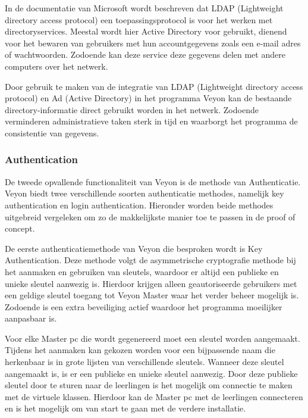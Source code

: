  In de documentatie van Microsoft \textcite{janicericketts-2023} wordt beschreven dat LDAP (Lightweight directory access protocol) een toepassingsprotocol is voor het werken met directoryservices. Meestal wordt hier Active Directory voor gebruikt, dienend voor het bewaren van gebruikers met hun accountgegevens zoals een e-mail adres of wachtwoorden. Zodoende kan deze service deze gegevens delen met andere computers over het netwerk.
 
 Door gebruik te maken van de integratie van LDAP (Lightweight directory access protocol) en Ad (Active Directory) in het programma Veyon kan de bestaande directory-informatie direct gebruikt worden in het netwerk. Zodoende verminderen administratieve taken sterk in tijd en waarborgt het programma de consistentie van gegevens.  
 
 \subsubsection{Authentication}
 De tweede opvallende functionaliteit van Veyon is de methode van Authenticatie. Veyon biedt twee verschillende soorten authenticatie methodes, namelijk key authentication en login authentication. Hieronder worden beide methodes uitgebreid vergeleken om zo de makkelijkste manier toe te passen in de proof of concept. \newline
 
 De eerste authenticatiemethode van Veyon die besproken wordt is Key Authentication. Deze methode volgt de asymmetrische cryptografie methode bij het aanmaken en gebruiken van sleutels, waardoor er altijd een publieke en unieke sleutel aanwezig is. Hierdoor krijgen alleen geautoriseerde gebruikers met een geldige sleutel toegang tot Veyon Master waar het verder beheer mogelijk is. Zodoende is een extra beveiliging actief waardoor het programma moeilijker aanpasbaar is. 
 
 Voor elke Master pc die wordt gegenereerd moet een sleutel worden aangemaakt. Tijdens het aanmaken kan gekozen worden voor een bijpassende naam die herkenbaar is in grote lijsten van verschillende sleutels. Wanneer deze sleutel aangemaakt is, is er een publieke en unieke sleutel aanwezig. Door deze publieke sleutel door te sturen naar de leerlingen is het mogelijk om connectie te maken met de virtuele klassen. Hierdoor kan de Master pc met de leerlingen connecteren en is het mogelijk om van start te gaan met de verdere installatie.\newline
 

